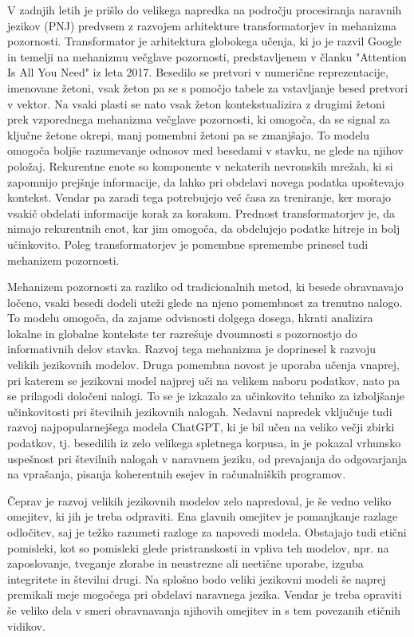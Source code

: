 \documentclass[a4paper,12pt,openright]{book}
\begin{document}
V zadnjih letih je prišlo do velikega napredka na področju procesiranja naravnih jezikov (PNJ) predvsem z razvojem arhitekture transformatorjev in mehanizma pozornosti.
Transformator je arhitektura globokega učenja, ki jo je razvil Google in temelji na mehanizmu večglave pozornosti, predstavljenem v članku "Attention Is All You Need" iz leta 2017.  \cite{datacamp_attention_2024} 
Besedilo se pretvori v numerične reprezentacije, imenovane žetoni, vsak žeton pa se s pomočjo tabele za vstavljanje besed pretvori v vektor. Na vsaki plasti se nato vsak žeton kontekstualizira z drugimi žetoni prek vzporednega mehanizma večglave pozornosti, ki omogoča, da se signal za ključne žetone okrepi, manj pomembni žetoni pa se zmanjšajo. To modelu omogoča boljše razumevanje odnosov med besedami v stavku, ne glede na njihov položaj.
Rekurentne enote so komponente v nekaterih nevronskih mrežah, ki si zapomnijo prejšnje informacije, da lahko pri obdelavi novega podatka upoštevajo kontekst. Vendar pa zaradi tega potrebujejo več časa za treniranje, ker morajo vsakič obdelati informacije korak za korakom.
Prednost transformatorjev je, da nimajo rekurentnih enot, kar jim omogoča, da obdelujejo podatke hitreje in bolj učinkovito. Poleg transformatorjev je pomembne spremembe prinesel tudi mehanizem pozornosti.
\cite{NIPS2017_3f5ee243}

Mehanizem pozornosti za razliko od tradicionalnih metod, ki besede obravnavajo ločeno, vsaki besedi dodeli uteži glede na njeno pomembnost za trenutno nalogo. To modelu omogoča, da zajame odvisnosti dolgega dosega, hkrati analizira lokalne in globalne kontekste ter razrešuje dvoumnosti s pozornostjo do informativnih delov stavka. Razvoj tega mehanizma je doprinesel k razvoju velikih jezikovnih modelov.
\cite{datacamp_attention_2024, KASNECI2023102274}
Druga pomembna novost je uporaba učenja vnaprej, pri katerem se jezikovni model najprej uči na velikem naboru podatkov, nato pa se prilagodi določeni nalogi. To se je izkazalo za učinkovito tehniko za izboljšanje učinkovitosti pri številnih jezikovnih nalogah.
Nedavni napredek vključuje tudi razvoj najpopularnejšega modela ChatGPT, ki je bil učen na veliko večji zbirki podatkov, tj. besedilih iz zelo velikega spletnega korpusa, in je pokazal vrhunsko uspešnost pri številnih nalogah v naravnem jeziku, od prevajanja do odgovarjanja na vprašanja, pisanja koherentnih esejev in računalniških programov.
\cite{KASNECI2023102274}

Čeprav je razvoj velikih jezikovnih modelov zelo napredoval, je še vedno veliko omejitev, ki jih je treba odpraviti. Ena glavnih omejitev je pomanjkanje razlage odločitev, saj je težko razumeti razloge za napovedi modela. Obstajajo tudi etični pomisleki, kot so pomisleki glede pristranskosti in vpliva teh modelov, npr. na zaposlovanje, tveganje zlorabe in neustrezne ali neetične uporabe, izguba integritete in številni drugi. Na splošno bodo veliki jezikovni modeli še naprej premikali meje mogočega pri obdelavi naravnega jezika. Vendar je treba opraviti še veliko dela v smeri obravnavanja njihovih omejitev in s tem povezanih etičnih vidikov.
\end{document}
